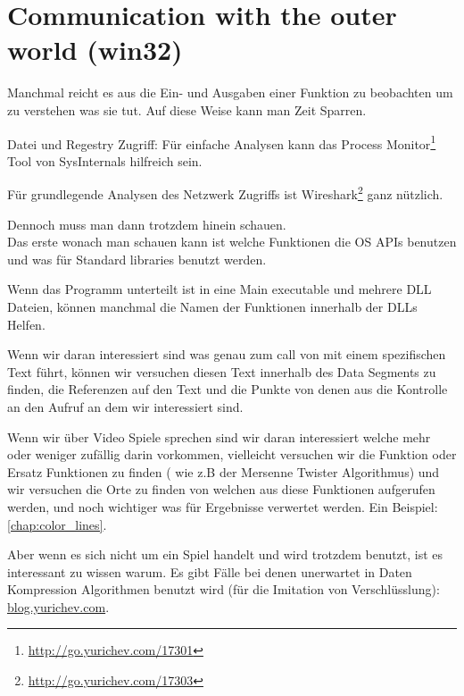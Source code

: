 \section{Communication with the outer world (win32)}

Manchmal reicht es aus die Ein- und Ausgaben einer Funktion zu beobachten um zu verstehen was sie tut.
Auf diese Weise kann man Zeit Sparren.

Datei und Regestry Zugriff:
Für einfache Analysen kann das Process Monitor\footnote{\url{http://go.yurichev.com/17301}}
Tool von SysInternals hilfreich sein.

Für grundlegende Analysen des Netzwerk Zugriffs ist Wireshark\footnote{\url{http://go.yurichev.com/17303}} ganz nützlich.

Dennoch muss man dann trotzdem hinein schauen. %
\\
Das erste wonach man schauen kann ist welche Funktionen die \ac{OS} \ac{API}s benutzen und was für Standard libraries
benutzt werden. 

Wenn das Programm unterteilt ist in eine Main executable und mehrere DLL Dateien, können manchmal die Namen der Funktionen innerhalb
der DLLs Helfen. 

Wenn wir daran interessiert sind was genau zum call von  mit einem spezifischen Text führt,
können wir versuchen diesen Text innerhalb des Data Segments zu finden, die Referenzen auf den Text und die 
Punkte von denen aus die Kontrolle an den  Aufruf an dem wir interessiert sind.

Wenn wir über Video Spiele sprechen sind wir daran interessiert welche mehr oder weniger zufällig darin vorkommen,
vielleicht versuchen wir die \rand Funktion oder Ersatz Funktionen zu finden ( wie z.B der Mersenne Twister Algorithmus) 
und wir versuchen die Orte zu finden von welchen aus diese Funktionen aufgerufen werden, und noch wichtiger was für
Ergebnisse verwertet werden. 
Ein Beispiel: \ref{chap:color_lines}.

Aber wenn es sich nicht um ein Spiel handelt und \rand wird trotzdem benutzt, ist es interessant zu wissen warum.
Es gibt Fälle bei denen unerwartet \rand in Daten Kompression Algorithmen benutzt wird (für die Imitation von Verschlüsslung):
\href{http://go.yurichev.com/17221}{blog.yurichev.com}.

